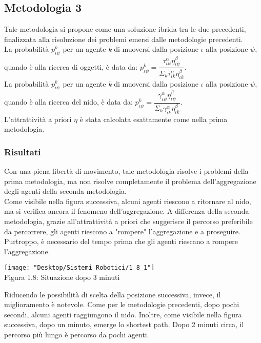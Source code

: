 \documentclass[12pt,a4paper,openright,twoside]{report}
\begin{document}
\subsection{Metodologia 3}

Tale metodologia si propone come una soluzione ibrida tra le due precedenti, finalizzata alla risoluzione dei problemi emersi dalle metodologie precedenti.\\
La probabilità $p^k_{\iota\psi}$ per un agente \textit{k} di muoversi dalla posizione $\iota$ alla posizione $\psi$, quando è alla ricerca di oggetti, è data da: $p^k_{\iota\psi}= \dfrac{\tau^\alpha_{\iota\psi}\eta^\beta_{\iota\psi}}{\Sigma_k\tau^\alpha_{\iota k}\eta^\beta_{\iota k}}$. \\
La probabilità $p^k_{\iota\psi}$ per un agente \textit{k} di muoversi dalla posizione $\iota$ alla posizione $\psi$, quando è alla ricerca del nido, è data da: $p^k_{\iota\psi}= \dfrac{\gamma^\alpha_{\iota\psi}\eta^\beta_{\iota\psi}}{\Sigma_k\gamma^\alpha_{\iota k}\eta^\beta_{\iota k}}$. \\
L'attrattività a priori $\eta$ è stata calcolata esattamente come nella prima metodologia.\\

\subsubsection{Risultati}

Con una piena libertà di movimento, tale metodologia risolve i problemi della prima metodologia, ma non risolve completamente il problema dell'aggregazione degli agenti della seconda metodologia.\\
Come visibile nella figura successiva, alcuni agenti riescono a ritornare al nido, ma si verifica ancora il fenomeno dell'aggregazione. A differenza della seconda metodologia, grazie all'attrattività a priori che suggerisce il percorso preferibile da percorrere, gli agenti riescono a "rompere" l'aggregazione e a proseguire. Purtroppo, è necessario del tempo prima che gli agenti riescano a rompere l'aggregazione.\\

\begin{center}  
	\texttt{[image: "Desktop/Sistemi Robotici/1\_8\_1"]}
	\\Figura 1.8: Situazione dopo 3 minuti
\end{center}

Riducendo le possibilità di scelta della posizione successiva, invece, il miglioramento è notevole. Come per le metodologie precedenti, dopo pochi secondi, alcuni agenti raggiungono il nido. Inoltre, come visibile nella figura successiva, dopo un minuto, emerge lo shortest path. Dopo 2 minuti circa, il percorso più lungo è percorso da pochi agenti.\\
\end{document}
